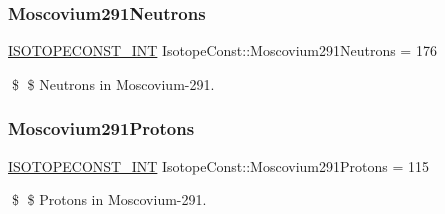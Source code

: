 \subsubsection{\texorpdfstring{Moscovium291\+Neutrons}{Moscovium291Neutrons}}
{\footnotesize\ttfamily \mbox{\hyperlink{group___isotope_const-_macros_ga5f18360b3e99483a35c32d789e62621c}{I\+S\+O\+T\+O\+P\+E\+C\+O\+N\+S\+T\+\_\+\+I\+NT}} Isotope\+Const\+::\+Moscovium291\+Neutrons = 176}

\$ \$ Neutrons in Moscovium-\/291. \mbox{\label{group___isotope_const-_moscovium-_mc291_ga84873c1a166b717c9ab5cf3674e5f7ec}} 
\subsubsection{\texorpdfstring{Moscovium291\+Protons}{Moscovium291Protons}}
{\footnotesize\ttfamily \mbox{\hyperlink{group___isotope_const-_macros_ga5f18360b3e99483a35c32d789e62621c}{I\+S\+O\+T\+O\+P\+E\+C\+O\+N\+S\+T\+\_\+\+I\+NT}} Isotope\+Const\+::\+Moscovium291\+Protons = 115}

\$ \$ Protons in Moscovium-\/291. 